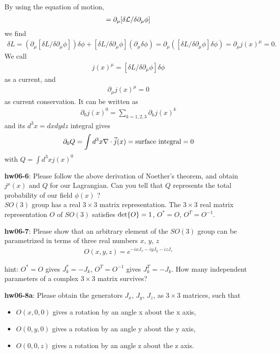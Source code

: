 \documentclass[12pt]{article}
\def\del{{\partial}}
\begin{document}
By using the equation of motion,
\begin{eqnarray}
  [\delta {\cal L} / \delta{\phi}]  =  \del_\mu [\delta {\cal L}/\delta{\del_\mu \phi}]
\end{eqnarray}
  we find
\begin{eqnarray}
  \delta L  =  (\del_\mu [\delta L/\delta{\del_\mu \phi}]) \delta\phi +  [\delta L / \delta{\del_\mu \phi}] (\del_\mu \delta\phi) = \del_\mu ([\delta L/\delta{\del_\mu \phi}] \delta\phi) =  \del_\mu j(x)^\mu = 0.
\end{eqnarray}
  We call
  \begin{eqnarray}
    j(x)^\mu =  [\delta L/\delta{\del_\mu \phi}] \delta\phi
  \end{eqnarray}
  as a current, and 
  \begin{eqnarray}
    \del_\mu j(x)^\mu = 0
  \end{eqnarray}
  as current conservation.  It can be written as
  \begin{eqnarray}
    \del_0 j(x)^0 = \sum_{k=1,2,3} \del_k j(x)^k
  \end{eqnarray}
   and its $d^3 x = dx dy dz$ integral gives
  \begin{eqnarray}
    \del_0 Q = \int d^3x \nabla \cdot {\vec j} (x) = {\rm surface~ integral} = 0
  \end{eqnarray}
    with $Q = \int d^3x j(x)^0$

{\bf hw06-6}:  Please follow the above derivation of Noether's theorem,
  and obtain $j^\mu(x)$ and $Q$ for our Lagrangian. Can you tell
  that $Q$ represents the total probability of our field $\phi(x)$ ?\\

  $SO(3)$ group has a real $3\times 3$ matrix representation.
  The $3 \times 3$ real matrix representation $O$ of $SO(3)$ satisfies
    ${\rm det}\{O\} = 1$, $O^* = O$, $O^T = O^{-1}$.

{\bf hw06-7}: Please show that an arbitrary element of the $SO(3)$
  group can be parametrized in terms of three real numbers $x$, $y$, $z$
\begin{eqnarray}
  O(x,y,z) = e^{ -i x J_x -i y J_y -i z J_z }
\end{eqnarray}

hint: $O^* = O$ gives $J_k^* = -J_k$, $O^T = O^{-1}$ gives $J_k^T = -J_k$.
  How many independent parameters of a complex $3 \times 3$ matrix survives?

{\bf hw06-8a}: Please obtain the generators $J_x$, $J_y$, $J_z$, as
  $3 \times 3$ matrices, such that
\begin{itemize}
  \item $O(x,0,0)$ gives a rotation by an angle x about the x axis,
  \item $O(0,y,0)$ gives a rotation by an angle y about the y axis,
  \item $O(0,0,z)$ gives a rotation by an angle z about the z axis.
\end{itemize}
\end{document}
